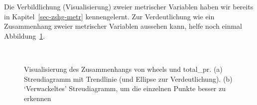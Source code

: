 \documentclass[
  letterpaper,
  oneside,
  open=any]{scrbook}
\theoremstyle{definition}
\theoremstyle{definition}
\theoremstyle{definition}
\theoremstyle{remark}
\begin{document}
Die Verbildlichung (Visualisierung) zweier metrischer Variablen haben
wir bereits in Kapitel~\ref{sec-zshg-metr} kennengelernt. Zur
Verdeutlichung wie ein Zusammenhang zweier metrischer Variablen aussehen
kann, helfe noch einmal Abbildung~\ref{fig-zshg}.

\begin{figure}

\begin{minipage}{0.45\linewidth}



\end{minipage}%
%
\begin{minipage}{0.10\linewidth}
~\end{minipage}%
%
\begin{minipage}{0.45\linewidth}



\end{minipage}%

\caption{\label{fig-zshg}Visualisierung des Zusammenhangs von wheels und
total\_pr. (a) Streudiagramm mit Trendlinie (und Ellipse zur
Verdeutlichung). (b) \enquote*{Verwackeltes} Streudiagramm, um die
einzelnen Punkte besser zu erkennen}

\end{figure}%
\end{document}
